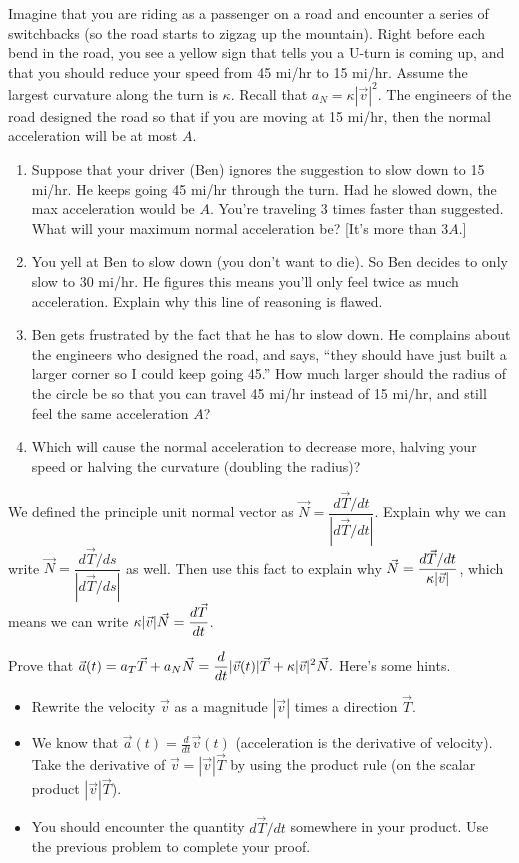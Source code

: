 \begin{problem}
 Imagine that you are riding as a passenger on a road and encounter a series of switchbacks (so the road starts to zigzag up the mountain). Right before each bend in the road, you see a yellow sign that tells you a U-turn is coming up, and that you should reduce your speed from 45 mi/hr to 15 mi/hr.  Assume the largest curvature along the turn is $\kappa$. Recall that $a_N=\kappa |\vec v|^2$. The engineers of the road designed the road so that if you are moving at 15 mi/hr, then the normal acceleration will be at most $A$. 
\begin{enumerate}
 \item Suppose that your driver (Ben) ignores the suggestion to slow down to 15 mi/hr.  He keeps going 45 mi/hr through the turn. Had he slowed down, the max acceleration would be $A$.  You're traveling 3 times faster than suggested.  What will your maximum normal acceleration be? [It's more than $3A$.]
 \item You yell at Ben to slow down (you don't want to die). So Ben decides to only slow to 30 mi/hr. He figures this means you'll only feel twice as much acceleration.  Explain why this line of reasoning is flawed.
 \item Ben gets frustrated by the fact that he has to slow down. He complains about the engineers who designed the road, and says, ``they should have just built a larger corner so I could keep going 45.''  How much larger should the radius of the circle be so that you can travel 45 mi/hr instead of 15 mi/hr, and still feel the same acceleration $A$?
 \item Which will cause the normal acceleration to decrease more, halving your speed or halving the curvature (doubling the radius)?
\end{enumerate}
\end{problem}

\begin{problem}
 We defined the principle unit normal vector as $\vec N = \dfrac{d\vec T/dt}{|d\vec T/dt|}$.  Explain why we can write $\vec N = \dfrac{d\vec T/ds}{|d\vec T/ds|}$ as well. Then use this fact to explain why $\displaystyle\vec N=\frac{d\vec T/dt}{\kappa|\vec v|}$, which means we can write $\displaystyle\kappa|\vec v|\vec N=\frac{d\vec T}{dt}$.  
\end{problem}


\begin{problem}
 Prove that $\displaystyle \vec a(t) = a_T\vec T+a_N\vec N=\frac{d}{dt}|\vec v(t)| \vec T + \kappa |\vec v|^2 \vec N.$ Here's some hints.
\begin{itemize}
 \item Rewrite the velocity $\vec v$ as a magnitude $|\vec v|$ times a direction $\vec T$.  
 \item We know that $\vec a(t) = \frac{d}{dt}\vec v(t)$ (acceleration is the derivative of velocity). Take the derivative of $\vec v = |\vec v|\vec T$ by using the product rule (on the scalar product $|\vec v|\vec T$).
 \item You should encounter the quantity $d\vec T/dt$ somewhere in your product.  Use the previous problem to complete your proof.
\end{itemize}
\end{problem}

